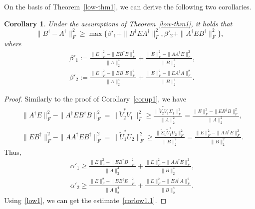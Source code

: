 \documentclass[11pt]{article}
\newtheorem{corollary}{Corollary}[section]
\begin{document}
On the basis of Theorem~\ref{low-thm1}, we can derive the following two corollaries.

\begin{corollary}
Under the assumptions of Theorem~\ref{low-thm1}, it holds that
\begin{equation}\label{corlow1.1}
\|B^{\dagger}-A^{\dagger}\|_{F}^{2}\geq\max\big\{\beta'_{1}+\|B^{\dagger}EA^{\dagger}\|_{F}^{2},\beta'_{2}+\|A^{\dagger}EB^{\dagger}\|_{F}^{2}\big\},
\end{equation}
where
\begin{align*}
&\beta'_{1}:=\frac{\|E\|_{F}^{2}-\|EB^{\dagger}B\|_{F}^{2}}{\|A\|_{2}^{4}}+\frac{\|E\|_{F}^{2}-\|AA^{\dagger}E\|_{F}^{2}}{\|B\|_{2}^{4}},\\
&\beta'_{2}:=\frac{\|E\|_{F}^{2}-\|BB^{\dagger}E\|_{F}^{2}}{\|A\|_{2}^{4}}+\frac{\|E\|_{F}^{2}-\|EA^{\dagger}A\|_{F}^{2}}{\|B\|_{2}^{4}}.
\end{align*}
\end{corollary}

\begin{proof}
Similarly to the proof of Corollary~\ref{corup1}, we have
\begin{align*}
&\|A^{\dagger}E\|_{F}^{2}-\|A^{\dagger}EB^{\dagger}B\|_{F}^{2}=\|\widetilde{V}_{2}^{\ast}V_{1}\|_{F}^{2}\geq\frac{\|\widetilde{V}_{2}^{\ast}V_{1}\Sigma_{1}\|_{F}^{2}}{\|A\|_{2}^{2}}=\frac{\|E\|_{F}^{2}-\|EB^{\dagger}B\|_{F}^{2}}{\|A\|_{2}^{2}},\\
&\|EB^{\dagger}\|_{F}^{2}-\|AA^{\dagger}EB^{\dagger}\|_{F}^{2}=\|\widetilde{U}_{1}^{\ast}U_{2}\|_{F}^{2}\geq\frac{\|\widetilde{\Sigma}_{1}\widetilde{U}_{1}^{\ast}U_{2}\|_{F}^{2}}{\|B\|_{2}^{2}}=\frac{\|E\|_{F}^{2}-\|AA^{\dagger}E\|_{F}^{2}}{\|B\|_{2}^{2}}.
\end{align*}
Thus,
\begin{align*}
&\alpha'_{1}\geq\frac{\|E\|_{F}^{2}-\|EB^{\dagger}B\|_{F}^{2}}{\|A\|_{2}^{4}}+\frac{\|E\|_{F}^{2}-\|AA^{\dagger}E\|_{F}^{2}}{\|B\|_{2}^{4}},\\
&\alpha'_{2}\geq\frac{\|E\|_{F}^{2}-\|BB^{\dagger}E\|_{F}^{2}}{\|A\|_{2}^{4}}+\frac{\|E\|_{F}^{2}-\|EA^{\dagger}A\|_{F}^{2}}{\|B\|_{2}^{4}}.
\end{align*}
Using~\eqref{low1}, we can get the estimate~\eqref{corlow1.1}.
\end{proof}
\end{document}
